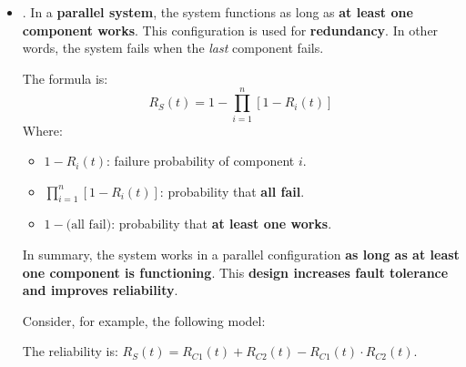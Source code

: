 \begin{itemize}
    \item {}. In a \textbf{parallel system}, the system functions as long as \textbf{at least one component works}. This configuration is used for \textbf{redundancy}. In other words, the system fails when the \emph{last} component fails.

    The formula is:
    \begin{equation}\label{eq: system fails when the last component fails - parallel}
        R_S(t) = 1 - \displaystyle\prod_{i=1}^{n} \left[1 - R_i(t)\right]
    \end{equation}
    Where:
    \begin{itemize}[label=*]
        \item $1 - R_i(t)$: failure probability of component $i$.
        \item $\displaystyle\prod_{i=1}^{n} \left[1 - R_i(t)\right]$: probability that \textbf{all fail}.
        \item $1 - \text{(all fail)}$: probability that \textbf{at least one works}.
    \end{itemize}
    In summary, the system works in a parallel configuration \textbf{as long as at least one component is functioning}. This \textbf{design increases fault tolerance and improves reliability}.

    \begin{examplebox}
        Consider, for example, the following model:
        \begin{center}
        \end{center}
        The reliability is: $R_S(t) = R_{C1}(t) + R_{C2}(t) - R_{C1}(t) \cdot R_{C2}(t)$.
    \end{examplebox}
\end{itemize}

